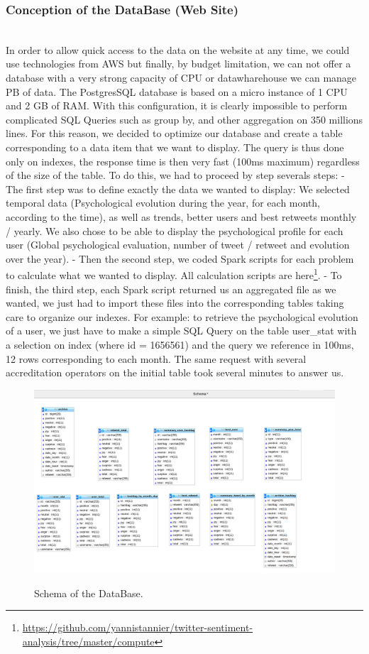 \documentclass{acmtog} %
\begin{document}
\subsubsection{Conception of the DataBase (Web Site)}
\label{subsub:conception_db}

~\\In order to allow quick access to the data on the website at any time, we could use technologies from AWS but finally, by budget limitation, we can not offer a database with a very strong capacity of CPU or datawharehouse we can manage PB of data. The PostgresSQL database is based on a micro instance of 1 CPU and 2 GB of RAM. With this configuration, it is clearly impossible to perform complicated SQL Queries such as group by, and other aggregation on 350 millions lines. For this reason, we decided to optimize our database and create a table corresponding to a data item that we want to display. The query is thus done only on indexes, the response time is then very fast (100ms maximum) regardless of the size of the table. To do this, we had to proceed by step severals steps:
 -  The first step was to define exactly the data we wanted to display: We selected temporal data (Psychological evolution during the year, for each month, according to the time), as well as trends, better users and best retweets monthly / yearly. We also chose to be able to display the psychological profile for each user (Global psychological evaluation, number of tweet / retweet and evolution over the year). 
 - Then the second step, we coded Spark scripts for each problem to calculate what we wanted to display. All calculation scripts are here\footnote{\url{https://github.com/yannistannier/twitter-sentiment-analysis/tree/master/compute}}. 
 - To finish, the third step, each Spark script returned us an aggregated file as we wanted, we just had to import these files into the corresponding tables taking care to organize our indexes. For example: to retrieve the psychological evolution of a user, we just have to make a simple SQL Query on the table user\_stat with a selection on index (where id = 1656561) and the query we reference in 100ms, 12 rows corresponding to each month. The same request with several accreditation operators on the initial table took several minutes to answer us.

 
\begin{figure}[H]
{\includegraphics[width=\linewidth]{table-web-db.png}}
\caption{Schema of the DataBase.}
  \label{fig:archivedb}
\end{figure}
\end{document}
